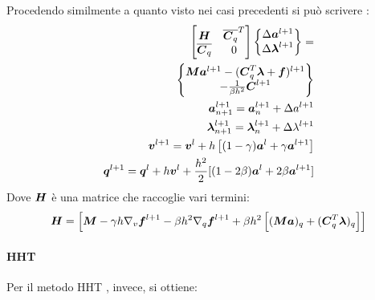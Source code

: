 Procedendo similmente a quanto visto nei casi precedenti si può scrivere \cite{negrutGavrea2005}:
\begin{align} \nonumber
    \begin{bmatrix}
    {\boldsymbol{H}} & \overline{{\boldsymbol{C}}_q}^T \\ \overline{{\boldsymbol{C}}_q} & 0 
    \end{bmatrix}
    \begin{Bmatrix}
    \Delta {\boldsymbol{a}}^{l+1} \\ \Delta {\boldsymbol{\lambda}}^{l+1}
    \end{Bmatrix}  = \\
    \begin{Bmatrix}
        {\boldsymbol{M}} {\boldsymbol{a}}^{l+1} - ({\boldsymbol{C}}_q^T {\boldsymbol{\lambda}}+{\boldsymbol{f}})^{l+1} \\
        -\frac{1}{\beta h^2}{\boldsymbol{C}}^{l+1}
    \end{Bmatrix} \\
    {\boldsymbol{a}}_{n+1}^{l+1} = {\boldsymbol{a}}_n^{l+1} + \Delta a^{l+1} \\
    {\boldsymbol{\lambda}}_{n+1}^{l+1} = {\boldsymbol{\lambda}}_n^{l+1} + \Delta \lambda^{l+1} \\
    {\boldsymbol{v}}^{l+1} = {\boldsymbol{v}}^l +h \left[ (1-\gamma){\boldsymbol{a}}^l + \gamma {\boldsymbol{a}}^{l+1} \right] \\
    {\boldsymbol{q}}^{l+1} = {\boldsymbol{q}}^l +h{\boldsymbol{v}}^l+\frac{h^2}{2}[(1-2\beta){\boldsymbol{a}}^l+2\beta{\boldsymbol{a}}^{l+1}]
\end{align}
Dove ${\boldsymbol{H}}$  è una matrice che raccoglie vari termini:
\begin{equation}
    {\boldsymbol{H}} = \left[ {\boldsymbol{M}}-\gamma h \nabla_v{\boldsymbol{f}}^{l+1} -\beta h^2 \nabla_q{\boldsymbol{f}}^{l+1} +
    \beta h^2 \left[ ({\boldsymbol{M}} {\boldsymbol{a}})_q + ({\boldsymbol{C}}_q^T {\boldsymbol{\lambda}})_q \right] \right]
\end{equation}

\paragraph{HHT} 
Per il metodo HHT \cite{Wang15HHT} \cite{JayNegrut2007}, invece, si ottiene:

